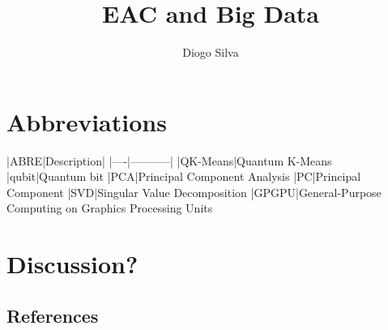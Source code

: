 \documentclass[10pt,a4paper,final]{article}
\author{Diogo Silva}
\title{EAC and Big Data}
\begin{document}
\onehalfspacing %

\section{Abbreviations}

|ABRE|Description|
|----|-----------|
|QK-Means|Quantum K-Means
|qubit|Quantum bit
|PCA|Principal Component Analysis
|PC|Principal Component
|SVD|Singular Value Decomposition
|GPGPU|General-Purpose Computing on Graphics Processing Units



\tableofcontents













\section{Discussion?}

\subsection{References}



\end{document}
